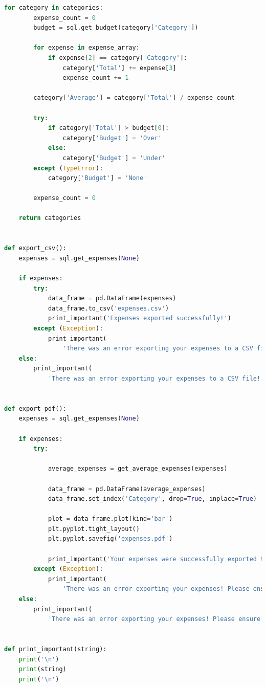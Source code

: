 \documentclass[11pt]{article}
\begin{document}
\begin{lstlisting}[language=Python, caption=Source code for \textit{exptools.py}.]
    for category in categories:
        expense_count = 0
        budget = sql.get_budget(category['Category'])

        for expense in expense_array:
            if expense[2] == category['Category']:
                category['Total'] += expense[3]
                expense_count += 1

        category['Average'] = category['Total'] / expense_count

        try:
            if category['Total'] > budget[0]:
                category['Budget'] = 'Over'
            else:
                category['Budget'] = 'Under'
        except (TypeError):
            category['Budget'] = 'None'

        expense_count = 0

    return categories


def export_csv():
    expenses = sql.get_expenses(None)

    if expenses:
        try:
            data_frame = pd.DataFrame(expenses)
            data_frame.to_csv('expenses.csv')
            print_important('Expenses exported successfully!')
        except (Exception):
            print_important(
                'There was an error exporting your expenses to a CSV file! Please try again!')
    else:
        print_important(
            'There was an error exporting your expenses to a CSV file! Please try again! Please ensure you have some categories and expenses stored!')


def export_pdf():
    expenses = sql.get_expenses(None)

    if expenses:
        try:

            average_expenses = get_average_expenses(expenses)

            data_frame = pd.DataFrame(average_expenses)
            data_frame.set_index('Category', drop=True, inplace=True)

            plot = data_frame.plot(kind='bar')
            plt.pyplot.tight_layout()
            plt.pyplot.savefig('expenses.pdf')

            print_important('Your expenses were successfully exported to PDF!')
        except (Exception):
            print_important(
                'There was an error exporting your expenses! Please ensure you have both some expenses and expense categories saved!')
    else:
        print_important(
            'There was an error exporting your expenses! Please ensure you have both some expenses and expense categories saved!')


def print_important(string):
    print('\n')
    print(string)
    print('\n')
  \end{lstlisting}
\end{document}
